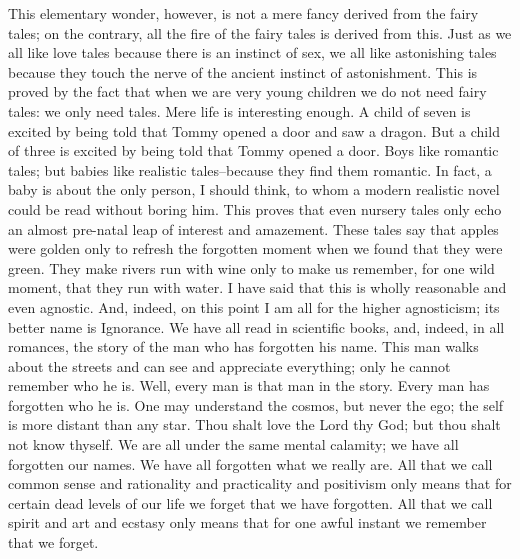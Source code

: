 \documentclass{book}
\begin{document}
This elementary wonder, however, is not a mere fancy derived from the fairy tales; on the contrary, all the fire of the fairy tales is derived from this. Just as we all like love tales because there is an instinct of sex, we all like astonishing tales because they touch the nerve of the ancient instinct of astonishment. This is proved by the fact that when we are very young children we do not need fairy tales: we only need tales. Mere life is interesting enough. A child of seven is excited by being told that Tommy opened a door and saw a dragon. But a child of three is excited by being told that Tommy opened a door. Boys like romantic tales; but babies like realistic tales–because they find them romantic. In fact, a baby is about the only person, I should think, to whom a modern realistic novel could be read without boring him. This proves that even nursery tales only echo an almost pre-natal leap of interest and amazement. These tales say that apples were golden only to refresh the forgotten moment when we found that they were green. They make rivers run with wine only to make us remember, for one wild moment, that they run with water. I have said that this is wholly reasonable and even agnostic. And, indeed, on this point I am all for the higher agnosticism; its better name is Ignorance. We have all read in scientific books, and, indeed, in all romances, the story of the man who has forgotten his name. This man walks about the streets and can see and appreciate everything; only he cannot remember who he is. Well, every man is that man in the story. Every man has forgotten who he is. One may understand the cosmos, but never the ego; the self is more distant than any star. Thou shalt love the Lord thy God; but thou shalt not know thyself. We are all under the same mental calamity; we have all forgotten our names. We have all forgotten what we really are. All that we call common sense and rationality and practicality and positivism only means that for certain dead levels of our life we forget that we have forgotten. All that we call spirit and art and ecstasy only means that for one awful instant we remember that we forget.
\end{document}
